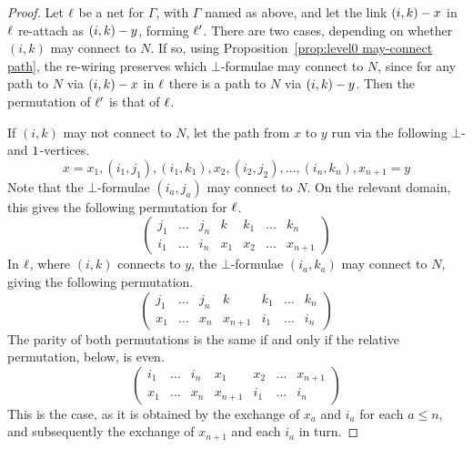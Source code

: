\begin{proof}
Let $\ell$ be a net for $\Gamma$, with $\Gamma$ named as above, and let the link $(i,k)-x$ in $\ell$ re-attach as $(i,k)-y$, forming $\ell'$.
%
There are two cases, depending on whether $(i,k)$ may connect to $N$.
%
If so, using Proposition~\ref{prop:level0 may-connect path}, the re-wiring preserves which $\bot$-formulae may connect to $N$, since for any path to $N$ via $(i,k)-x$ in $\ell$ there is a path to $N$ via $(i,k)-y$.
%
Then the permutation of $\ell'$ is that of $\ell$.


If $(i,k)$ may not connect to $N$, let the path from $x$ to $y$ run via the following $\bot$- and $1$-vertices.
\[
	x=x_1, (i_1,j_1), (i_1,k_1), x_2, (i_2,j_2), \dotsc, (i_n,k_n), x_{n+1}=y 	
\]
Note that the $\bot$-formulae $(i_a,j_a)$ may connect to $N$.
%
On the relevant domain, this gives the following permutation for $\ell$.
\[
\left(\begin{array}{ccccccc}
	j_1 & \dotso & j_n &  k  & k_1 & \dotso & k_n \\
	i_1 & \dotso & i_n & x_1 & x_2 & \dotso & x_{n+1}
\end{array}\right)
\]
In $\ell$, where $(i,k)$ connects to $y$, the $\bot$-formulae $(i_a,k_a)$ may connect to $N$, giving the following permutation.
\[
\left(\begin{array}{ccccccc}
	j_1 & \dotso & j_n &    k    & k_1 & \dotso & k_n \\
	x_1 & \dotso & x_n & x_{n+1} & i_1 & \dotso & i_n
\end{array}\right)
\]
The parity of both permutations is the same if and only if the relative permutation, below, is even.
\[
\left(\begin{array}{ccccccc}
	i_1 & \dotso & i_n & x_1     & x_2 & \dotso & x_{n+1} \\
	x_1 & \dotso & x_n & x_{n+1} & i_1 & \dotso & i_n
\end{array}\right)
\]
This is the case, as it is obtained by the exchange of $x_a$ and $i_a$ for each $a\leq n$, and subsequently the exchange of $x_{n+1}$ and each $i_a$ in turn.

\end{proof}















